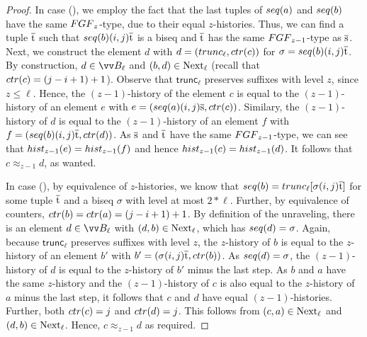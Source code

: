 \begin{proof}
  In case (), we employ the fact that the last tuples of $\seq{a}$ and $\seq{b}$ have the same $\FGF_{z}$-type, due to their equal $z$-histories.
  Thus, we can find a tuple $\overline{\mathrm{t}}$ such that $\seq{b} (i,j) \elemtuplet$ is a biseq and $\overline{\mathrm{t}}$ has the same $\FGF_{z-1}$-type as $\overline{\mathrm{s}}$.
  Next, we construct the element $d$ with $d = (\mathsf{trunc}_{\ell}, \ctr{c})$ for $\sigma = \seq{b}(i,j)\elemtuplet$.
  By construction, $d \in \unraveldom{B}_{\ell}$ and $(b,d) \in \mathrm{Next}_{\ell}$ (recall that $\ctr{c} = (j-i+1)+1$).
  Observe that $\mathsf{trunc}_{\ell}$ preserves suffixes with level $z$, since $z \le \ell$.
  Hence, the $(z-1)$-history of the element $c$ is equal to the $(z-1)$-history of an element $e$ with $e = (\seq{a}(i,j)\elemtuples, \ctr{c})$.
  Similary, the $(z-1)$-history of $d$ is equal to the $(z-1)$-history of an element $f$ with $f = (\seq{b}(i,j)\elemtuplet, \ctr{d})$.
  As $\overline{\mathrm{s}}$ and $\overline{\mathrm{t}}$ have the same $\FGF_{z-1}$-type, we can see that $\hist{z-1}{e} = \hist{z-1}{f}$ and hence $\hist{z-1}{c} = \hist{z-1}{d}$.
  It follows that $c \approx_{z-1} d$, as wanted.

  In case (), by equivalence of $z$-histories, we know that $\seq{b} = \mathsf{trunc}_{\ell}[\sigma(i,j)\elemtuplet]$ for some tuple $\overline{\mathrm{t}}$ and a biseq $\sigma$ with level at most $2 * \ell$.
  Further, by equivalence of counters, $\ctr{b} = \ctr{a} = (j-i+1) + 1$.
  By definition of the unraveling, there is an element $d \in \unraveldom{B}_{\ell}$ with $(d,b) \in \mathrm{Next}_{\ell}$, which has $\seq{d} = \sigma$.
  Again, because $\mathsf{trunc}_{\ell}$ preserves suffixes with level $z$, the $z$-history of $b$ is equal to the $z$-history of an element $b'$ with $b' = (\sigma(i,j)\elemtuplet, \ctr{b})$.
  As $\seq{d} = \sigma$, the $(z-1)$-history of $d$ is equal to the $z$-history of $b'$ minus the last step.
  As $b$ and $a$ have the same $z$-history and the $(z-1)$-history of $c$ is also equal to the $z$-history of $a$ minus the last step, it follows that $c$ and $d$ have equal $(z-1)$-histories.
  Further, both $\ctr{c} = j$ and $\ctr{d} = j$.
  This follows from $(c,a) \in \mathrm{Next}_{\ell}$ and $(d,b) \in \mathrm{Next}_{\ell}$.
  Hence, $c \approx_{z-1} d$ as required.
\end{proof}

